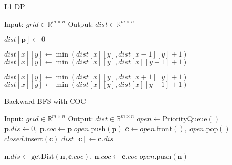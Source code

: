 \documentclass{article}
\begin{document}
\begin{algorithm}
    \caption{L1 DP}
    \begin{algorithmic}[1]
        \STATE Input: $grid \in \mathbb{R}^{m \times n}$
        \STATE Output: $dist \in \mathbb{R}^{m \times n}$

                \STATE $dist[\bm{p}] \gets 0$
            \ENDIF
        \ENDFOR

                \STATE $dist[x][y] \gets \min(dist[x][y], dist[x - 1][y] + 1)$
                \STATE $dist[x][y] \gets \min(dist[x][y], dist[x ][y - 1] + 1)$
            \ENDFOR
        \ENDFOR

                \STATE $dist[x][y] \gets \min(dist[x][y], dist[x + 1][y] + 1)$
                \STATE $dist[x][y] \gets \min(dist[x][y], dist[x ][y + 1] + 1)$
            \ENDFOR
        \ENDFOR
    \end{algorithmic}
\end{algorithm}

\begin{algorithm}
    \caption{Backward BFS with COC}
    \begin{algorithmic}[1]
        \STATE Input: $grid \in \mathbb{R}^{m \times n}$
        \STATE Output: $dist \in \mathbb{R}^{m \times n}$
        \STATE $open \gets \mathrm{Priority Queue}()$
                \STATE $\bm{p}.dis \gets 0,\ \bm{p}.coc \gets \bm{p}$
                \STATE $open.\mathrm{push}(\bm{p})$
            \ENDIF
        \ENDFOR
            \STATE $\bm{c} \gets open.\mathrm{front}(),\ open.\mathrm{pop}()$
            \STATE $closed.\mathrm{insert}(\bm{c})$
            \STATE $dist[\bm{c}] \gets \bm{c}.dis$

                    \STATE $\bm{n}.dis \gets \mathrm{getDist}(\bm{n}, \bm{c}.coc),\ \bm{n}.coc \gets \bm{c}.coc$
                    \STATE $open.\mathrm{push}(\bm{n})$
                \ENDIF
            \ENDFOR
        \ENDWHILE
    \end{algorithmic}
\end{algorithm}
\end{document}
